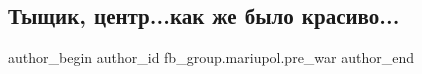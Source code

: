  
 
 
 
 

\subsection{Тыщик, центр...как же было красиво...}
\label{sec:02_02_2023.fb.fb_group.mariupol.pre_war.1.tishchik__tsentr_kak}

\ifcmt
 author_begin
   author_id fb_group.mariupol.pre_war
 author_end
\fi
